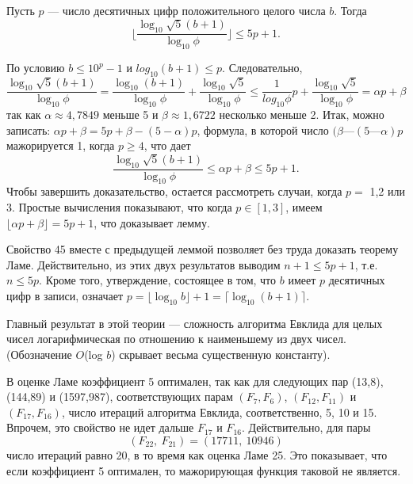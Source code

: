\begin{lemma}
\hspace*{15pt}Пусть $p$ — число десятичных цифр положительного целого числа $b$. 
Тогда 
\begin{equation*}
\lfloor \frac{\log_{10}{\sqrt{5}(b+1)}}{\log_{10}{\phi}} \rfloor \leqslant 5p + 1.
\end{equation*}
\end{lemma}
\newpage

\begin{myproof}
По условию $b \leqslant 10^p - 1$ и $log_{10}{(b+1)} \leqslant p$. Следовательно,
\begin{equation*}
\frac{\log_{10}{\sqrt{5}(b+1)}}{\log_{10}{\phi}} = \frac{\log_{10}{(b+1)}}{\log_{10}{\phi}} + \frac{\log_{10}{\sqrt{5}}}{\log_{10}{\phi}} \leqslant \frac{1}{log_{10}{\phi}}p + \frac{\log_{10}{\sqrt{5}}}{\log_{10}{\phi}} = \alpha p + \beta
\end{equation*}
так как $\alpha \approx 4,7849$ меньше 5 и $\beta \approx 1,6722$ несколько меньше 2. 
Итак, можно записать: $\alpha p + \beta = 5p + \beta - (5 - \alpha)p$, формула, в которой 
число $(\beta — (5 — \alpha)p$ мажорируется 1, когда $p \geq 4$, что дает
\begin{equation*}
\frac{\log_{10}{\sqrt{5}(b+1)}}{\log_{10}{\phi}} \leqslant \alpha p + \beta \leqslant 5p + 1.
\end{equation*}
Чтобы завершить доказательство, остается рассмотреть случаи, 
когда $p =$ 1,2 или 3. Простые вычисления показывают, что когда 
$p \in [1,3]$, имеем $\lfloor \alpha p + \beta \rfloor = 5p + 1$, что доказывает лемму.
\end{myproof} 

\begin{myproof}
Свойство 45 вместе с предыдущей леммой позволяет без труда  
доказать теорему Ламе. Действительно, из этих двух результатов  
выводим $n + 1 \leqslant 5p + 1$, т.е. $n \leqslant 5p$. Кроме того, утверждение,  
состоящее в том, что $b$ имеет $p$ десятичных цифр в записи, означает 
$p = \lfloor \log_{10}{b} \rfloor + 1 = \lceil \log_{10}{(b+1)} \rceil$.
\end{myproof}

Главный результат в этой теории — сложность алгоритма  
Евклида для целых чисел логарифмическая по отношению к наименьшему из 
двух чисел. (Обозначение $O$(log $b$) скрывает весьма существенную  
константу).

\begin{mynotice}
В оценке Ламе коэффициент 5 оптимален, так как 
для следующих пар (13,8), (144,89) и (1597,987),  
соответствующих парам $(F_7,F_6)$, $(F_{12},F_{11})$ и $(F_{17},F_{16})$, число итераций  
алгоритма Евклида, соответственно, 5, 10 и 15. Впрочем, это свойство 
не идет дальше $F_{17}$ и $F_{16}$. Действительно, для пары
\begin{equation*}
(F_{22},\: F_{21}) = (17711,\: 10946)
\end{equation*} 
число итераций равно 20, в то время как оценка Ламе 25. Это  
показывает, что если коэффициент 5 оптимален, то мажорирующая 
функция таковой не является. 
\end{mynotice} 
\newpage
